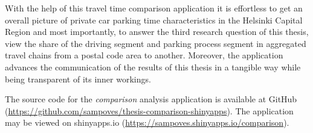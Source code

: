 With the help of this travel time comparison application it is effortless to get an overall picture of private car parking time characteristics in the Helsinki Capital Region and most importantly, to answer the third research question of this thesis, view the share of the driving segment and parking process segment in aggregated travel chains from a postal code area to another. Moreover, the application advances the communication of the results of this thesis in a tangible way while being transparent of its inner workings.

The source code for the \textit{comparison} analysis application is available at GitHub (\textcolor{blue}{\url{https://github.com/sampoves/thesis-comparison-shinyapps}}). The application may be viewed on shinyapps.io (\textcolor{blue}{\url{https://sampoves.shinyapps.io/comparison}}).


